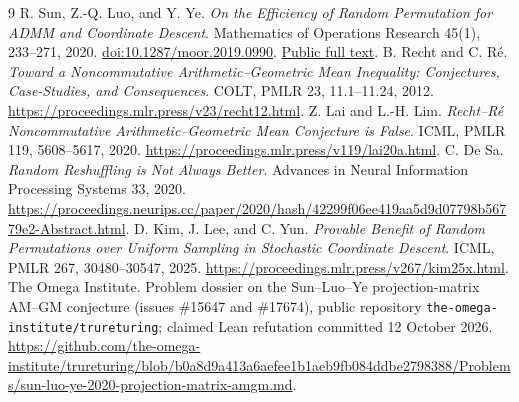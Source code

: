 \documentclass[11pt]{article}
\begin{document}
\clearpage
\begin{thebibliography}{9}
 R. Sun, Z.-Q. Luo, and Y. Ye.
\emph{On the Efficiency of Random Permutation for ADMM and Coordinate Descent}.
Mathematics of Operations Research 45(1), 233--271, 2020.
\href{https://doi.org/10.1287/moor.2019.0990}{doi:10.1287/moor.2019.0990}.
\href{https://par.nsf.gov/servlets/purl/10201446}{Public full text}.
 B. Recht and C. R\'e.
\emph{Toward a Noncommutative Arithmetic--Geometric Mean Inequality: Conjectures, Case-Studies, and Consequences}.
COLT, PMLR 23, 11.1--11.24, 2012.
\url{https://proceedings.mlr.press/v23/recht12.html}.
 Z. Lai and L.-H. Lim.
\emph{Recht--R\'e Noncommutative Arithmetic--Geometric Mean Conjecture is False}.
ICML, PMLR 119, 5608--5617, 2020.
\url{https://proceedings.mlr.press/v119/lai20a.html}.
 C. De Sa.
\emph{Random Reshuffling is Not Always Better}.
Advances in Neural Information Processing Systems 33, 2020.
\url{https://proceedings.neurips.cc/paper/2020/hash/42299f06ee419aa5d9d07798b56779e2-Abstract.html}.
 D. Kim, J. Lee, and C. Yun.
\emph{Provable Benefit of Random Permutations over Uniform Sampling in Stochastic Coordinate Descent}.
ICML, PMLR 267, 30480--30547, 2025.
\url{https://proceedings.mlr.press/v267/kim25x.html}.
 The Omega Institute.
Problem dossier on the Sun--Luo--Ye projection-matrix AM--GM conjecture (issues \#15647 and \#17674), public repository \nolinkurl{the-omega-institute/trureturing}; claimed Lean refutation committed 12 October 2026.
\url{https://github.com/the-omega-institute/trureturing/blob/b0a8d9a413a6aefee1b1aeb9fb084ddbe2798388/Problems/sun-luo-ye-2020-projection-matrix-amgm.md}.
\end{thebibliography}
\end{document}

